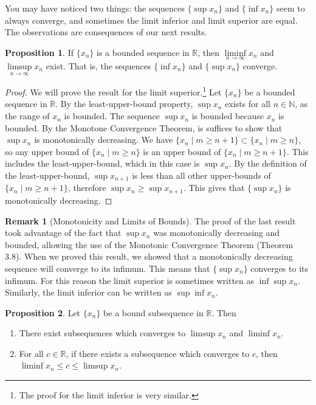 \documentclass{article}
\newcommand{\N}{\mathbb{N}}
\newcommand{\R}{\mathbb{R}}
\theoremstyle{definition}
\newtheorem{proposition}{Proposition}[section]
\newtheorem{remark}{Remark}[section]
\begin{document}
	You may have noticed two things: the sequences $ \{\sup x_n\} $ and $ \{\inf x_n\} $ seem to always converge, and sometimes the limit inferior and limit superior are equal. The observations are consequences of our next results. 
	\begin{proposition}
		If $ \{x_n\} $ is a bounded sequence in $ \R $, then $ \liminf\limits_{n\to\infty} x_n $ and $ \limsup\limits_{n\to\infty} x_n $ exist. That is, the sequences $ \{\inf x_n\} $ and $ \{\sup x_n\} $ converge.
	\end{proposition} 
	\begin{proof}
		We will prove the result for the limit superior.\footnote{The proof for the limit inferior is very similar.} Let $ \{x_n\} $ be a bounded sequence in $ \R $. By the least-upper-bound property, $ \sup x_n $ exists for all $ n\in\N $, as the range of $ x_n $ is bounded. The sequence $ \sup x_n $ is bounded because $ x_n $ is bounded. By the Monotone Convergence Theorem, is suffices to show that $ \sup x_n $ is monotonically decreasing. We have $ \{x_n\mid m\ge n+1\}\subset \{x_n\mid m\ge n\} $, so any upper bound of $ \{x_n\mid m\ge n\} $ is an upper bound of  $ \{x_n\mid m\ge n+1\} $. This includes the least-upper-bound, which in this case is $ \sup x_n $. By the definition of the least-upper-bound, $ \sup x_{n+1} $ is less than all other upper-bounds of $ \{x_n\mid m\ge n+1\} $, therefore $ \sup x_n\ge \sup x_{n+1} $. This gives that $ \{\sup x_n\} $ is monotonically decreasing.   
	\end{proof}
	\begin{remark}[Monotonicity and Limits of Bounds]
		The proof of the last result took advantage of the fact that $ {\sup x_n} $ was monotonically decreasing and bounded, allowing the use of the Monotonic Convergence Theorem (Theorem 3.8). When we proved this result, we showed that a monotonically decreasing sequence will converge to its infimum. This means that $ \{\sup x_n\} $ converges to its infimum. For this reason the limit superior is sometimes written as $ \inf\sup x_n $. Similarly, the limit inferior can be written as $ \sup\inf x_n $. 
	\end{remark}
	\begin{proposition}
		Let $ \{x_n\} $ be a bound subsequence in $ \R $. Then 
		\begin{enumerate}
			\item There exist subsequences which converges to $ \limsup x_n $ and $ \liminf x_n $.
			\item For all $ c\in\R $, if there exists a subsequence which converges to $ c $, then $ \liminf x_n \le c\le \limsup x_n $. 
		\end{enumerate}
	\end{proposition}
\end{document}
